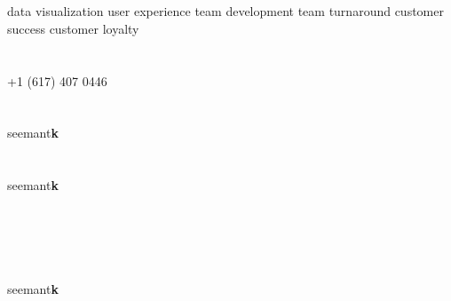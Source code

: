 \documentclass[]{friggeri-cv} %
\newcommand{\rotxc}[1]{\begin{sideways}#1\end{sideways}}
\newcommand{\invert}[1]{\rotxc{\rotxc{#1}}}
\begin{document}
\begin{aside} %
\section{{\scriptsize {}}}
data visualization
user experience
team development
team turnaround
customer success
customer loyalty
~
~
\section{\href{tel:617.407.0446}{\scriptsize {}}}
+1 (617) 407 0446
~
~
\section{\href{skype:seemantk}{}}
seemant\textbf{k}
~
~
\section{\href{mailto:seemantk@gmail.com}{}}
seemant\textbf{k}
~
~
\section{\href{http://www.github.com/seemantk}{} ~ \href{http://www.twitter.com/seemantk}{} ~ \href{http://www.linkedin.com/in/seemantk}{}}
seemant\textbf{k}
\end{aside}


\section{{}{} {\normalsize{}~~}}
\end{document}
